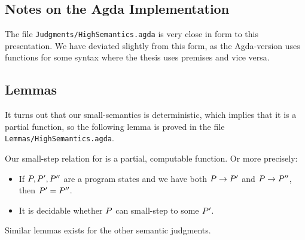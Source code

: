 
\subsection{Notes on the Agda Implementation}

The file \texttt{Judgments/HighSemantics.agda} is very close in form to this
presentation. We have deviated slightly from this form, as the Agda-version uses
functions for some syntax where the thesis uses premises and vice versa.

\subsection{Lemmas}

It turns out that our small-semantics is deterministic, which implies that it is
a partial function, so the following lemma is proved in the file
\texttt{Lemmas/HighSemantics.agda}.

\begin{lemma}
  \label{lemma:computhigh}
  Our small-step relation for \ATAL is a partial, computable function. Or more
  precisely:

  \begin{itemize}
  \item If $P, P', P''$ are a program states and we have both
    ${P} -> {P'}$ and ${P} -> {P''}$, then
    $P' = P''$.
  \item It is decidable whether $P$ can small-step to some $P'$.
  \end{itemize}

  Similar lemmas exists for the other semantic judgments.
\end{lemma}

